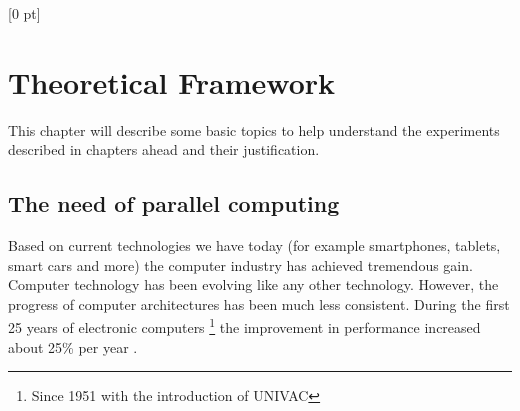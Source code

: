 \titlespacing{\chapter}{0 pt}{30 pt}{50 pt}[0 pt]
\titleformat{\section}{\Large\bfseries}{\thesection}{0 pt}{\hspace{30 pt}}
\titleformat{\subsection}{\large\bfseries}{\thesubsection}{0 pt}{\hspace{30 pt}}
\pagestyle{fancy}
\fancyhead[LO,LE]{\footnotesize\emph{\leftmark}}
\fancyhead[RO,RE]{\thepage}
\fancyfoot[CO,CE]{}
\setcounter{secnumdepth}{5}

\chapter{Theoretical Framework}  %
\noindent

This chapter will describe some basic topics to help understand the
experiments described in chapters ahead and their justification.

\section{The need of parallel computing}
\noindent

Based on current technologies we have today (for example smartphones, tablets,
smart cars and more) the computer industry has achieved tremendous gain. 
Computer technology has been evolving like any other technology.
However, the progress of computer architectures has been much less
consistent. During the first 25 years of electronic computers \footnote{Since
1951 with the introduction of UNIVAC} the improvement in performance increased
about 25\% per year \cite{Hennessy}. 

